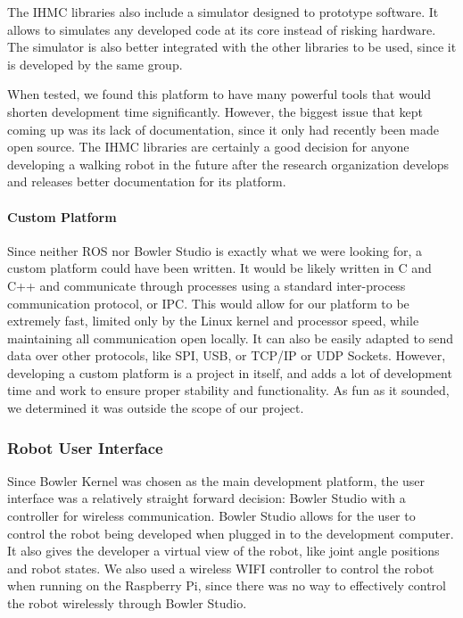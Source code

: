                 The IHMC libraries also include a simulator designed to prototype software. It allows to simulates any developed code at its core instead of risking hardware. The simulator is also better integrated with the other libraries to be used, since it is developed by the same group.
                
                When tested, we found this platform to have many powerful tools that would shorten development time significantly. However, the biggest issue that kept coming up was its lack of documentation, since it only had recently been made open source. The IHMC libraries are certainly a good decision for anyone developing a walking robot in the future after the research organization develops and releases better documentation for its platform.
            
            \paragraph*{Custom Platform}
                Since neither ROS nor Bowler Studio is exactly what we were looking for, a custom platform could have been written. It would be likely written in C and C++ and communicate through processes using a standard inter-process communication protocol, or IPC. This would allow for our platform to be extremely fast, limited only by the Linux kernel and processor speed, while maintaining all communication open locally. It can also be easily adapted to send data over other protocols, like SPI, USB, or TCP/IP or UDP Sockets. However, developing a custom platform is a project in itself, and adds a lot of development time and work to ensure proper stability and functionality. As fun as it sounded, we determined it was outside the scope of our project.
        
        \subsubsection{Robot User Interface}
            Since Bowler Kernel was chosen as the main development platform, the user interface was a relatively straight forward decision: Bowler Studio with a controller for wireless communication. Bowler Studio allows for the user to control the robot being developed when plugged in to the development computer. It also gives the developer a virtual view of the robot, like joint angle positions and robot states. We also used a wireless WIFI controller to control the robot when running on the Raspberry Pi, since there was no way to effectively control the robot wirelessly through Bowler Studio.